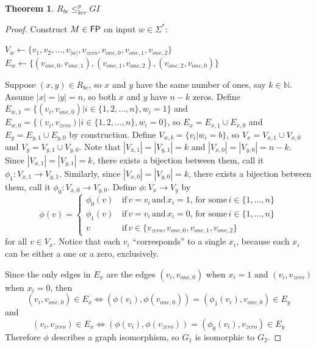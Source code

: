 \documentclass{article}
\newtheorem{theorem}{Theorem}%
\theoremstyle{definition}
\newcommand{\plain}[1]{\,\text{#1}\,} %
\newcommand{\sigmastar}{\Sigma^{*}}
\newcommand{\kr}{\leq^{p}_{ker}} %
\begin{document}
\begin{theorem}\label{thm:rbc_gi}$R_{bc}\kr GI$\end{theorem}
\begin{proof}
  Construct $M\in {\ensuremath{\mathsf{FP}}}$ on input $w \in \sigmastar$:\\
  \begin{algorithm}[H]
    $V_w\gets\{v_1, v_2, \ldots, v_{|w|}, v_{zero}, v_{one,0}, v_{one,1},
    v_{one,2}\}$\;
    $E_w\gets\{(v_{one,0}, v_{one,1}), (v_{one,1}, v_{one,2}), (v_{one,2},
    v_{one,0})\}$\; 
  \end{algorithm}
  
  Suppose $(x, y)\in R_{bc}$, so $x$ and $y$ have the same number of ones, say
  $k\in\mathbb{N}$. Assume $|x|=|y|=n$, so both $x$ and $y$ have $n-k$
  zeros. Define $E_{w,1}=\{(v_i, v_{one,0})|i\in\{1,2,\ldots,n\}, w_i = 1\}$
  and $E_{w,0}=\{(v_i, v_{zero})|i\in\{1,2,\ldots,n\}, w_i = 0\}$, so $E_x =
  E_{x,1}\cup E_{x,0}$ and $E_y = E_{y,1} \cup E_{y,0}$ by construction. Define
  $V_{w,b}=\{v_i|w_i=b\}$, so $V_x=V_{x,1} \cup V_{x,0}$ and $V_y=V_{y,1} \cup
  V_{y,0}$. Note that $|V_{x,1}|=|V_{y,1}|=k$ and
  $|V_{x,0}|=|V_{y,0}|=n-k$. Since $|V_{x,1}|=|V_{y,1}|=k$, there exists a
  bijection between them, call it $\phi_1:V_{x,1}\to V_{y,1}$. Similarly, since
  $|V_{x,0}|=|V_{y,0}|=k$, there exists a bijection between them, call it
  $\phi_0:V_{x,0}\to V_{y,0}$. Define $\phi:V_x\to V_y$ by
  \begin{displaymath}
    \phi(v) = 
    \begin{cases}
      \phi_0(v) & \plain{if} v = v_i \plain{and} x_i = 1, \plain{for some}
      i\in\{1,\ldots,n\}\\ 
      \phi_1(v) & \plain{if} v = v_i \plain{and} x_i = 0, \plain{for some}
      i\in\{1,\ldots,n\}\\ 
      v & \plain{if} v \in \{v_{zero}, v_{one,0}, v_{one,1}, v_{one,2}\}
    \end{cases}
  \end{displaymath}
  for all $v\in V_x$. Notice that each $v_i$ ``corresponds'' to a
  single $x_i$, because each $x_i$ can be either a one or a zero,
  exclusively.

  Since the only edges in $E_x$ are the edges $(v_i, v_{one,0})$ when $x_i=1$
  and $(v_i, v_{zero})$ when $x_i=0$, then 
  \begin{displaymath}
    (v_i, v_{one,0})\in E_x \iff (\phi(v_i), \phi(v_{one,0}))=(\phi_1(v_i),
    v_{one,0})\in E_y
  \end{displaymath}
  and 
  \begin{displaymath}
    (v_i, v_{zero})\in E_x \iff (\phi(v_i), \phi(v_{zero})) = (\phi_0(v_i),
    v_{zero})\in E_y
  \end{displaymath}
  Therefore $\phi$ describes a graph isomorphism, so $G_1$ is isomorphic to
  $G_2$.
  

\end{proof}
\end{document}
